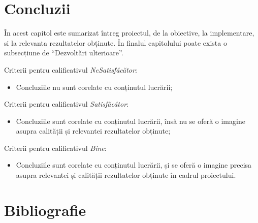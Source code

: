 \documentclass[12pt,a4paper]{report}
\begin{document}
\chapter{Concluzii}
În acest capitol este sumarizat întreg proiectul, de la obiective, la implementare, si la relevanta rezultatelor obținute. În finalul capitolului poate exista o subsecțiune de ``Dezvoltări ulterioare''.

Criterii pentru calificativul \textit{Ne\textit{Satisfăcător}}: 
\begin{itemize}
	\item	Concluziile nu sunt corelate cu conținutul lucrării;
\end{itemize}

Criterii pentru calificativul \textit{Satisfăcător}: 
\begin{itemize}
	\item	Concluziile sunt corelate cu conținutul lucrării, însă nu se oferă o imagine asupra calității și relevantei rezultatelor obținute;
\end{itemize}

Criterii pentru calificativul \textit{Bine}: 
\begin{itemize}
	\item	Concluziile sunt corelate cu conținutul lucrării, și se oferă o imagine precisa asupra relevantei și calității rezultatelor obținute în cadrul proiectului. 
\end{itemize}

\chapter*{Bibliografie}  
% 
% 
\end{document}
